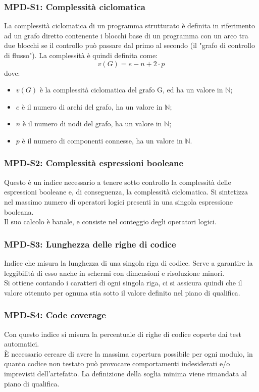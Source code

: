 \subsubsection{MPD-S1: Complessità ciclomatica}
La complessità ciclomatica di un programma strutturato è definita in riferimento ad un grafo diretto
contenente i blocchi base di un programma con un arco tra due blocchi se il controllo può passare dal
primo al secondo (il "grafo di controllo di flusso"). La complessità è quindi definita come:
\[
    v(G) = e − n + 2 \cdot p  
\]
dove:
\begin{itemize}
    \item $v(G)$ è la complessità ciclomatica del grafo G, ed ha un valore in $\mathbb{N}$;
    \item $e$ è il numero di archi del grafo, ha un valore in $\mathbb{N}$;
    \item $n$ è il numero di nodi del grafo, ha un valore in $\mathbb{N}$;
    \item $p$ è il numero di componenti connesse, ha un valore in $\mathbb{N}$.
\end{itemize}

\subsubsection{MPD-S2: Complessità espressioni booleane}
Questo è un indice necessario a tenere sotto controllo la complessità delle espressioni booleane e, di conseguenza, la complessità ciclomatica.
Si sintetizza nel massimo numero di operatori logici presenti in una singola espressione booleana.\\
Il suo calcolo è banale, e consiste nel conteggio degli operatori logici.

\subsubsection{MPD-S3: Lunghezza delle righe di codice}
Indice che misura la lunghezza di una singola riga di codice. Serve a garantire la leggibilità di esso anche in schermi
con dimensioni e risoluzione minori.\\
Si ottiene contando i caratteri di ogni singola riga, ci si assicura quindi che il valore ottenuto per ognuna stia sotto il valore
definito nel piano di qualifica.

\subsubsection{MPD-S4: Code coverage}
Con questo indice si misura la percentuale di righe di codice coperte dai test automatici.\\
È necessario cercare di avere la massima copertura possibile per ogni modulo, in quanto codice non testato
può provocare comportamenti indesiderati e/o imprevisti dell'artefatto. La definizione della soglia minima viene rimandata al piano di qualifica.
